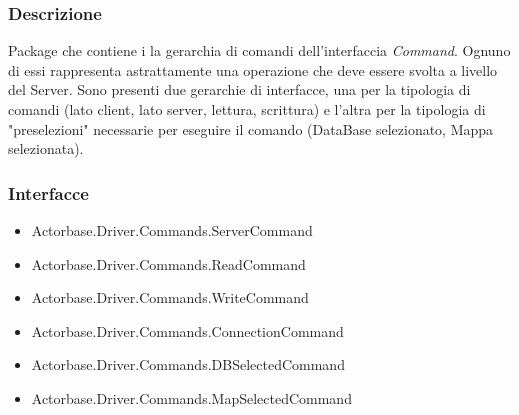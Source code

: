 \documentclass[a4paper]{article}
\begin{document}
		\subsubsection{Descrizione}
			Package che contiene i la gerarchia di comandi dell'interfaccia \emph{Command}. Ognuno di essi rappresenta astrattamente una operazione che deve essere svolta a livello del Server. Sono presenti due gerarchie di interfacce, una per la tipologia di comandi (lato client, lato server, lettura, scrittura) e l'altra per la tipologia di "preselezioni" necessarie per eseguire il comando (DataBase selezionato, Mappa selezionata).
		
		\subsubsection{Interfacce}
			\begin{itemize}
				\item Actorbase.Driver.Commands.ServerCommand
				\item Actorbase.Driver.Commands.ReadCommand
				\item Actorbase.Driver.Commands.WriteCommand
				\item Actorbase.Driver.Commands.ConnectionCommand
				\item Actorbase.Driver.Commands.DBSelectedCommand
				\item Actorbase.Driver.Commands.MapSelectedCommand
			\end{itemize}
\end{document}

